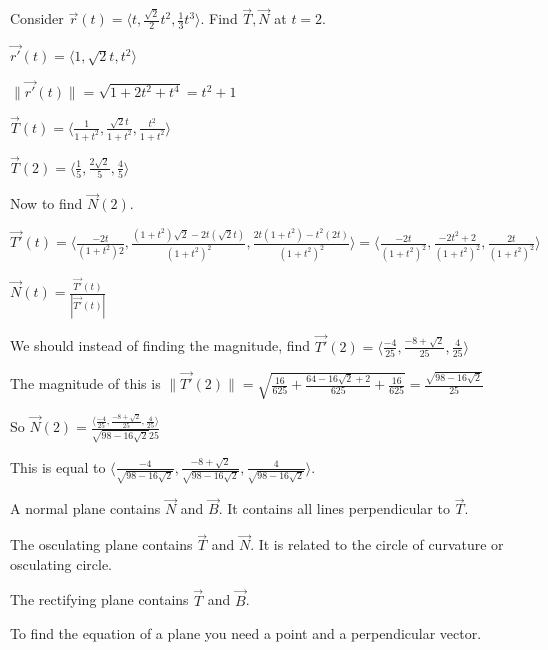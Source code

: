 \documentclass[../calc3.tex]{subfiles}
\begin{document}
\begin{example}
    Consider $\vec{r}(t)=\langle t,\frac{\sqrt{2}}{2}t^2, \frac{1}{3}t^3\rangle$. Find $\vec{T}, \vec{N}$ at $t=2$.

    $\vec{r'}(t)=\langle 1,\sqrt{2}t,t^2\rangle$

    $\| \vec{r'}(t)\|=\sqrt{1+2t^2+t^4} = t^2+1$

    $\vec{T}(t)=\langle \frac{1}{1+t^2}, \frac{\sqrt{2}t}{1+t^2}, \frac{t^2}{1+t^2}\rangle$

    $\vec{T}(2)=\langle \frac{1}{5}, \frac{2\sqrt{2}}{5}, \frac{4}{5}\rangle$

    Now to find $\vec{N}(2)$.

    $\vec{T'}(t)=\langle \frac{-2t}{(1+t^2)2}, \frac{(1+t^2)\sqrt{2}-2t(\sqrt{2}t)}{(1+t^2)^2}, \frac{2t(1+t^2)-t^2(2t)}{(1+t^2)^2}\rangle = \langle \frac{-2t}{(1+t^2)^2}, \frac{-2t^2+2}{(1+t^2)^2}, \frac{2t}{(1+t^2)^2}\rangle$

    $\vec{N}(t)=\frac{\vec{T'}(t)}{|\vec{T'}(t)|}$

    We should instead of finding the magnitude, find $\vec{T'}(2)=\langle \frac{-4}{25}, \frac{-8+\sqrt{2}}{25}, \frac{4}{25}\rangle$

    The magnitude of this is $\| \vec{T'}(2)\| = \sqrt{\frac{16}{625}+\frac{64-16\sqrt{2}+2}{625}+\frac{16}{625}} = \frac{\sqrt{98-16\sqrt{2}}}{25}$

    So $\vec{N}(2)= \frac{\langle \frac{-4}{25}, \frac{-8+\sqrt{2}}{25}, \frac{4}{25}\rangle}{\sqrt{98-16\sqrt{2}}{25}}$

    This is equal to $\langle \frac{-4}{\sqrt{98-16\sqrt{2}}}, \frac{-8+\sqrt{2}}{\sqrt{98-16\sqrt{2}}}, \frac{4}{\sqrt{98-16\sqrt{2}}}\rangle$.
\end{example}

A normal plane contains $\vec{N}$ and $\vec{B}$. It contains all lines perpendicular to $\vec{T}$.

The osculating plane contains $\vec{T}$ and $\vec{N}$. It is related to the circle of curvature or osculating circle.

The rectifying plane contains $\vec{T}$ and $\vec{B}$.

To find the equation of a plane you need a point and a perpendicular vector.
\end{document}
